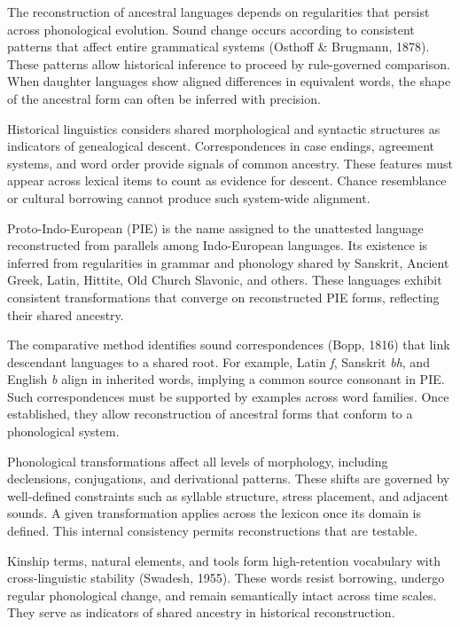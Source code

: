 The reconstruction of ancestral languages depends on regularities that persist across phonological evolution. Sound change occurs according to consistent patterns that affect entire grammatical systems (Osthoff \& Brugmann, 1878). These patterns allow historical inference to proceed by rule-governed comparison. When daughter languages show aligned differences in equivalent words, the shape of the ancestral form can often be inferred with precision.

Historical linguistics considers shared morphological and syntactic structures as indicators of genealogical descent. Correspondences in case endings, agreement systems, and word order provide signals of common ancestry. These features must appear across lexical items to count as evidence for descent. Chance resemblance or cultural borrowing cannot produce such system-wide alignment.

Proto-Indo-European (PIE) is the name assigned to the unattested language reconstructed from parallels among Indo-European languages. Its existence is inferred from regularities in grammar and phonology shared by Sanskrit, Ancient Greek, Latin, Hittite, Old Church Slavonic, and others. These languages exhibit consistent transformations that converge on reconstructed PIE forms, reflecting their shared ancestry.

The comparative method identifies sound correspondences (Bopp, 1816) that link descendant languages to a shared root. For example, Latin \emph{f}, Sanskrit \emph{bh}, and English \emph{b} align in inherited words, implying a common source consonant in PIE. Such correspondences must be supported by examples across word families. Once established, they allow reconstruction of ancestral forms that conform to a phonological system.

Phonological transformations affect all levels of morphology, including declensions, conjugations, and derivational patterns. These shifts are governed by well-defined constraints such as syllable structure, stress placement, and adjacent sounds. A given transformation applies across the lexicon once its domain is defined. This internal consistency permits reconstructions that are testable.

Kinship terms, natural elements, and tools form high-retention vocabulary with cross-linguistic stability (Swadesh, 1955). These words resist borrowing, undergo regular phonological change, and remain semantically intact across time scales. They serve as indicators of shared ancestry in historical reconstruction.

